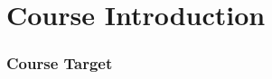 \section{Course Introduction}

\begin{frame}
\frametitle{Course Target}
\scalebox{0.9}
{
	\begin{adjustbox}{max totalsize={.9\textheight},center}
	\end{adjustbox}
}
\end{frame}

